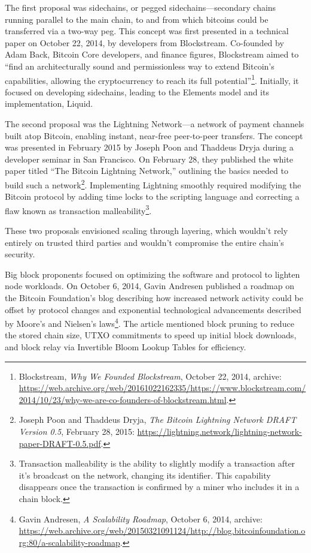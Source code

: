 \documentclass[
  a5paper,
  smalldemyvopaper,10pt,twoside,onecolumn,openright,extrafontsizes,hidelinks]{memoir}
\begin{document}
The first proposal was sidechains, or pegged sidechains---secondary
chains running parallel to the main chain, to and from which bitcoins
could be transferred via a two-way peg. This concept was first presented
in a technical paper on October 22, 2014, by developers from
Blockstream. Co-founded by Adam Back, Bitcoin Core developers, and
finance figures, Blockstream aimed to ``find an architecturally sound
and permissionless way to extend Bitcoin's capabilities, allowing the
cryptocurrency to reach its full potential''\footnote{Blockstream,
  \emph{Why We Founded Blockstream}, October 22, 2014, archive:
  \url{https://web.archive.org/web/20161022162335/https://www.blockstream.com/2014/10/23/why-we-are-co-founders-of-blockstream.html}.}.
Initially, it focused on developing sidechains, leading to the Elements
model and its implementation, Liquid.

The second proposal was the Lightning Network---a network of payment
channels built atop Bitcoin, enabling instant, near-free peer-to-peer
transfers. The concept was presented in February 2015 by Joseph Poon and
Thaddeus Dryja during a developer seminar in San Francisco. On February
28, they published the white paper titled ``The Bitcoin Lightning
Network,'' outlining the basics needed to build such a
network\footnote{Joseph Poon and Thaddeus Dryja, \emph{The Bitcoin
  Lightning Network DRAFT Version 0.5}, February 28, 2015:
  \url{https://lightning.network/lightning-network-paper-DRAFT-0.5.pdf}.}.
Implementing Lightning smoothly required modifying the Bitcoin protocol
by adding time locks to the scripting language and correcting a flaw
known as transaction malleability\footnote{Transaction malleability is
  the ability to slightly modify a transaction after it's broadcast on
  the network, changing its identifier. This capability disappears once
  the transaction is confirmed by a miner who includes it in a chain
  block.}.

These two proposals envisioned scaling through layering, which wouldn't
rely entirely on trusted third parties and wouldn't compromise the
entire chain's security.

Big block proponents focused on optimizing the software and protocol to
lighten node workloads. On October 6, 2014, Gavin Andresen published a
roadmap on the Bitcoin Foundation's blog describing how increased
network activity could be offset by protocol changes and exponential
technological advancements described by Moore's and Nielsen's
laws\footnote{Gavin Andresen, \emph{A Scalability Roadmap}, October 6,
  2014, archive:
  \url{https://web.archive.org/web/20150321091124/http://blog.bitcoinfoundation.org:80/a-scalability-roadmap}.}.
The article mentioned block pruning to reduce the stored chain size,
UTXO commitments to speed up initial block downloads, and block relay
via Invertible Bloom Lookup Tables for efficiency.
\end{document}

